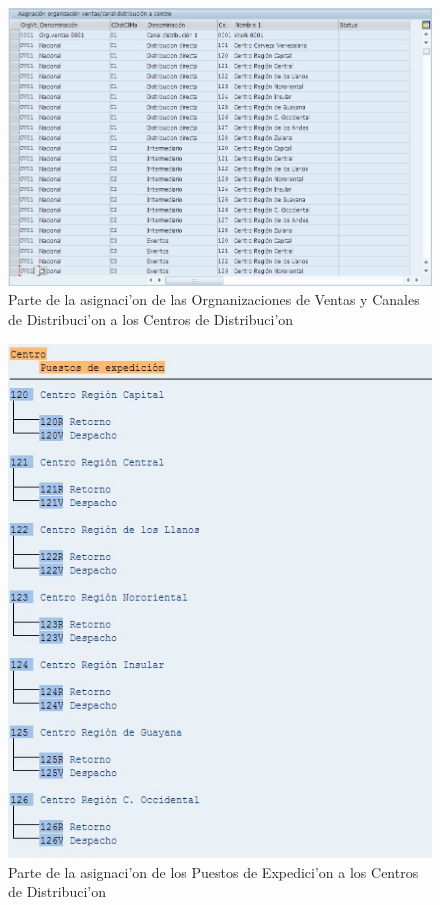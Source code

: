 \begin{figure}[htb]
\centering
\includegraphics[scale=0.65,type=jpg,ext=.jpg,read=.jpg]{figures/OrgCanalCentro}
\caption{Parte de la asignaci'on de las Orgnanizaciones de Ventas y Canales de Distribuci'on a los Centros de Distribuci'on}
\label{fig:asigna5}
\end{figure}
\begin{figure}[htb]
\centering
\includegraphics[scale=0.65,type=jpg,ext=.jpg,read=.jpg]{figures/ExpedicionCentro}
\caption{Parte de la asignaci'on de los Puestos de Expedici'on a los Centros de Distribuci'on}
\label{fig:asigna6}
\end{figure}

